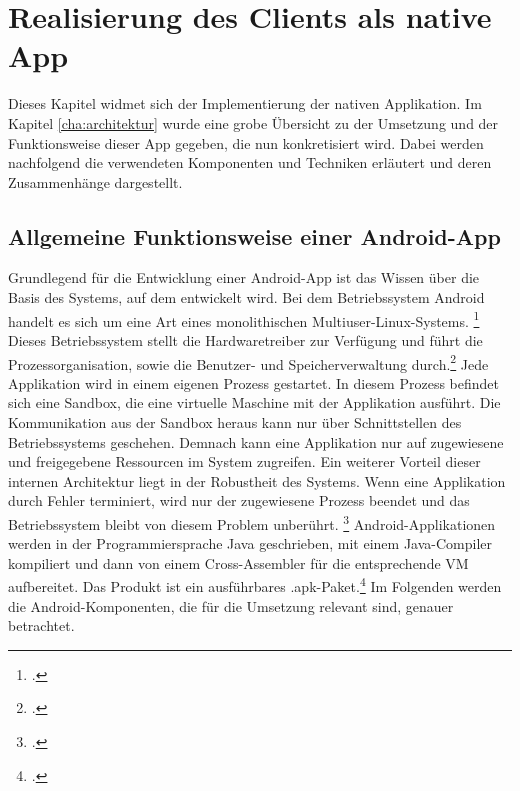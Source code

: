 \chapter{Realisierung des Clients als native App}
\label{cha:native-app}
Dieses Kapitel widmet sich der Implementierung der nativen Applikation. Im Kapitel \ref{cha:architektur} wurde eine grobe Übersicht zu der Umsetzung und der Funktionsweise dieser \gls{App} gegeben, die nun konkretisiert wird.
Dabei werden nachfolgend die verwendeten Komponenten und Techniken erläutert und deren Zusammenhänge dargestellt.
\section{Allgemeine Funktionsweise einer Android-App}
\label{sec:definition-android}
Grundlegend für die Entwicklung einer \gls{Android}-App ist das Wissen über die Basis des Systems, auf dem entwickelt wird. 
Bei dem Betriebssystem \gls{Android} handelt es sich um eine Art eines \gls{monolithisch}en Multiuser-\gls{Linux}-Systems. \footcite{Android-Fundamentals}
Dieses Betriebssystem stellt die Hardwaretreiber zur Verfügung und führt die Prozessorganisation, sowie die Benutzer- und Speicherverwaltung durch.\footcite[S. 19ff.]{Android-BeckerPant}
Jede Applikation wird in einem eigenen Prozess gestartet. In diesem Prozess befindet sich eine \gls{Sandbox}, die eine virtuelle Maschine mit der Applikation ausführt. Die Kommunikation aus der Sandbox heraus kann nur über Schnittstellen des Betriebssystems geschehen. Demnach kann eine Applikation nur auf zugewiesene und freigegebene Ressourcen im System zugreifen. Ein weiterer Vorteil dieser internen Architektur liegt in der Robustheit des Systems. Wenn eine Applikation durch Fehler terminiert, wird nur der zugewiesene Prozess beendet und das Betriebssystem bleibt von diesem Problem unberührt. \footcite{Android-SystemPermissions}
\gls{Android}-Applikationen werden in der Programmiersprache \gls{Java} geschrieben, mit einem Java-\ac{Compiler} kompiliert und dann von einem Cross-Assembler für die entsprechende \ac{VM} aufbereitet. Das Produkt ist ein ausführbares \ac{.apk}-Paket.\footcite{Android-Fundamentals}
Im Folgenden werden die \gls{Android}-Komponenten, die für die Umsetzung relevant sind, genauer betrachtet.
